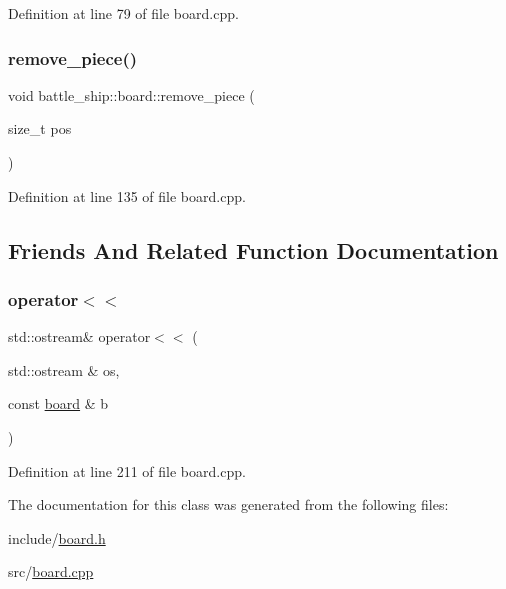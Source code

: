 Definition at line 79 of file board.\+cpp.

\mbox{\label{classbattle__ship_1_1board_a19d236125f444778e5789109d9c1093b}} 
\subsubsection{\texorpdfstring{remove\+\_\+piece()}{remove\_piece()}}
{\footnotesize\ttfamily void battle\+\_\+ship\+::board\+::remove\+\_\+piece (\begin{DoxyParamCaption}\item[{size\+\_\+t}]{pos }\end{DoxyParamCaption})}



Definition at line 135 of file board.\+cpp.



\subsection{Friends And Related Function Documentation}
\mbox{\label{classbattle__ship_1_1board_a1a31fc970cf43cac6d5b1a44e3831f5d}} 
\subsubsection{\texorpdfstring{operator$<$$<$}{operator<<}}
{\footnotesize\ttfamily std\+::ostream\& operator$<$$<$ (\begin{DoxyParamCaption}\item[{std\+::ostream \&}]{os,  }\item[{const \hyperlink{classbattle__ship_1_1board}{board} \&}]{b }\end{DoxyParamCaption})\hspace{0.3cm}{\ttfamily [friend]}}



Definition at line 211 of file board.\+cpp.



The documentation for this class was generated from the following files\+:\begin{DoxyCompactItemize}
\item 
include/\hyperlink{board_8h}{board.\+h}\item 
src/\hyperlink{board_8cpp}{board.\+cpp}\end{DoxyCompactItemize}
